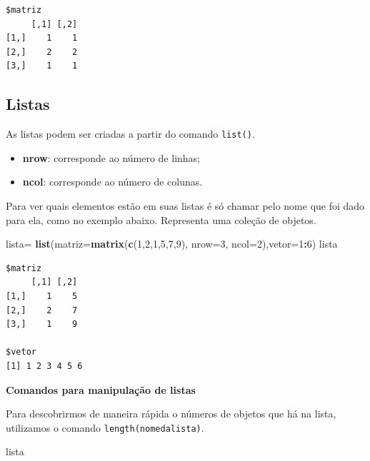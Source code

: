\documentclass[12pt,brazil,oneside]{book}
\newenvironment{Shaded}{\begin{snugshade}}{\end{snugshade}}
\newcommand{\DataTypeTok}[1]{\textcolor[rgb]{0.13,0.29,0.53}{#1}}
\newcommand{\DecValTok}[1]{\textcolor[rgb]{0.00,0.00,0.81}{#1}}
\newcommand{\KeywordTok}[1]{\textcolor[rgb]{0.13,0.29,0.53}{\textbf{#1}}}
\newcommand{\NormalTok}[1]{#1}
\newcommand{\OperatorTok}[1]{\textcolor[rgb]{0.81,0.36,0.00}{\textbf{#1}}}
\newcommand{\StringTok}[1]{\textcolor[rgb]{0.31,0.60,0.02}{#1}}
\providecommand{\tightlist}{%
  \setlength{\itemsep}{0pt}\setlength{\parskip}{0pt}}
\begin{document}
\begin{verbatim}
$matriz
     [,1] [,2]
[1,]    1    1
[2,]    2    2
[3,]    1    1
\end{verbatim}

\hypertarget{listas}{%
\subsection{Listas}\label{listas}}

As listas podem ser criadas a partir do comando \texttt{list()}.

\begin{itemize}
\tightlist
\item
  \textbf{nrow}: corresponde ao número de linhas;
\item
  \textbf{ncol}: corresponde ao número de colunas.
\end{itemize}

Para ver quais elementos estão em suas listas é só chamar pelo nome que foi dado para ela, como no exemplo abaixo. Representa uma coleção de objetos.

\begin{Shaded}
\begin{Highlighting}[]
\NormalTok{lista=}\StringTok{ }\KeywordTok{list}\NormalTok{(}\DataTypeTok{matriz=}\KeywordTok{matrix}\NormalTok{(}\KeywordTok{c}\NormalTok{(}\DecValTok{1}\NormalTok{,}\DecValTok{2}\NormalTok{,}\DecValTok{1}\NormalTok{,}\DecValTok{5}\NormalTok{,}\DecValTok{7}\NormalTok{,}\DecValTok{9}\NormalTok{), }\DataTypeTok{nrow=}\DecValTok{3}\NormalTok{, }\DataTypeTok{ncol=}\DecValTok{2}\NormalTok{),}\DataTypeTok{vetor=}\DecValTok{1}\OperatorTok{:}\DecValTok{6}\NormalTok{)}
\NormalTok{lista}
\end{Highlighting}
\end{Shaded}

\begin{verbatim}
$matriz
     [,1] [,2]
[1,]    1    5
[2,]    2    7
[3,]    1    9

$vetor
[1] 1 2 3 4 5 6
\end{verbatim}

\textbf{Comandos para manipulação de listas}

Para descobrirmos de maneira rápida o números de objetos que há na lista, utilizamos o comando \texttt{length(nomedalista)}.

\begin{Shaded}
\begin{Highlighting}[]
\NormalTok{lista}
\end{Highlighting}
\end{Shaded}
\end{document}
